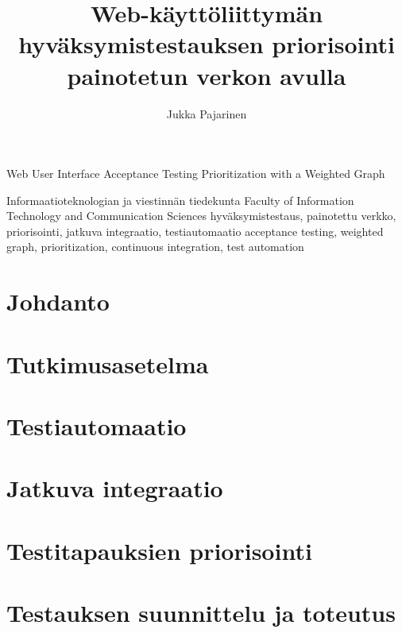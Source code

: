\documentclass[finnish, authoryear]{config/tauthesis}
\theoremstyle{definition}
\begin{document}
\frontmatter
\title
  {Web-käyttöliittymän hyväksymistestauksen priorisointi painotetun verkon avulla}
  {Web User Interface Acceptance Testing Prioritization with a Weighted Graph}
\subtitle{}{}
\author{Jukka Pajarinen}
\facultyname
  {Informaatioteknologian ja viestinnän tiedekunta}
  {Faculty of Information Technology and Communication Sciences}
\keywords
  {hyväksymistestaus, painotettu verkko, priorisointi, jatkuva integraatio, testiautomaatio}
  {acceptance testing, weighted graph, prioritization, continuous integration, test automation}
\maketitle
{}
\tableofcontents
\listoffigures
\listoftables
\glossary

\mainmatter
\chapter{Johdanto}
\label{ch:johdanto}

\chapter{Tutkimusasetelma}
\label{ch:tutkimusasetelma}

\chapter{Testiautomaatio}
\label{ch:testiautomaatio}

\chapter{Jatkuva integraatio}
\label{ch:jatkuva_integraatio}

\chapter{Testitapauksien priorisointi}
\label{ch:testitapauksien_priorisointi}

\chapter{Testauksen suunnittelu ja toteutus}
\label{ch:testauksen_suunnittelu_ja_toteutus}

\end{document}
